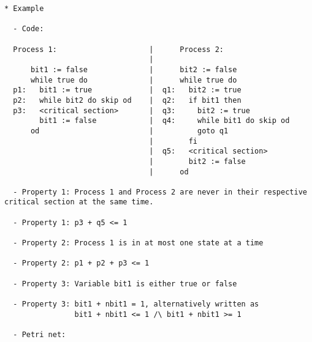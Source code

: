 \begin{verbatim}
* Example

  - Code:

  Process 1:                     |      Process 2:
                                 |
      bit1 := false              |      bit2 := false
      while true do              |      while true do
  p1:   bit1 := true             |  q1:   bit2 := true
  p2:   while bit2 do skip od    |  q2:   if bit1 then
  p3:   <critical section>       |  q3:     bit2 := true
        bit1 := false            |  q4:     while bit1 do skip od
      od                         |          goto q1
                                 |        fi
                                 |  q5:   <critical section>
                                 |        bit2 := false
                                 |      od

  - Property 1: Process 1 and Process 2 are never in their respective critical section at the same time.

  - Property 1: p3 + q5 <= 1

  - Property 2: Process 1 is in at most one state at a time

  - Property 2: p1 + p2 + p3 <= 1
  
  - Property 3: Variable bit1 is either true or false

  - Property 3: bit1 + nbit1 = 1, alternatively written as
                bit1 + nbit1 <= 1 /\ bit1 + nbit1 >= 1

  - Petri net:

\end{verbatim}



\newpage

